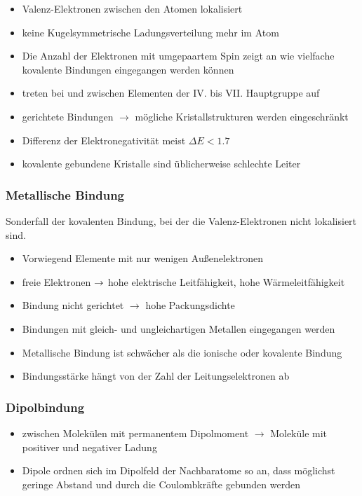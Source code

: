 \documentclass[fs, footer]{latex4ei}
\begin{document}
\begin{multicols*}{4}
{	\begin{itemize}
    	\item Valenz-Elektronen zwischen den Atomen lokalisiert
		\item keine Kugelsymmetrische Ladungsverteilung mehr im Atom
		\item Die Anzahl der Elektronen mit umgepaartem Spin zeigt an wie vielfache kovalente Bindungen eingegangen werden können
		\item treten bei und zwischen Elementen der IV. bis VII. Hauptgruppe auf
		\item gerichtete Bindungen $\rightarrow$ mögliche Kristallstrukturen werden eingeschränkt
		\item Differenz der Elektronegativität meist $\Delta E<1.7$
		\item kovalente gebundene Kristalle sind üblicherweise schlechte Leiter 
	\end{itemize}


\subsubsection{Metallische Bindung}
	Sonderfall der kovalenten Bindung, bei der die Valenz-Elektronen nicht lokalisiert sind.
	\begin{itemize}
    	\item Vorwiegend Elemente mit nur wenigen Außenelektronen
		\item freie Elektronen $\rightarrow $ hohe elektrische Leitfähigkeit, hohe Wärmeleitfähigkeit
		\item Bindung nicht gerichtet $\rightarrow$ hohe Packungsdichte 
		\item Bindungen mit gleich- und ungleichartigen Metallen eingegangen werden
		\item Metallische Bindung ist schwächer als die ionische oder kovalente Bindung
		\item Bindungsstärke hängt von der Zahl der Leitungselektronen ab
	\end{itemize}
	
\subsubsection{Dipolbindung}
	\begin{itemize}
		\item zwischen Molekülen mit permanentem Dipolmoment $\rightarrow$ Moleküle mit positiver und negativer Ladung 
		\item Dipole ordnen sich im Dipolfeld der Nachbaratome so an, dass möglichst geringe Abstand und durch die Coulombkräfte gebunden werden 
    \end{itemize}

}
\end{multicols*}
\end{document}
